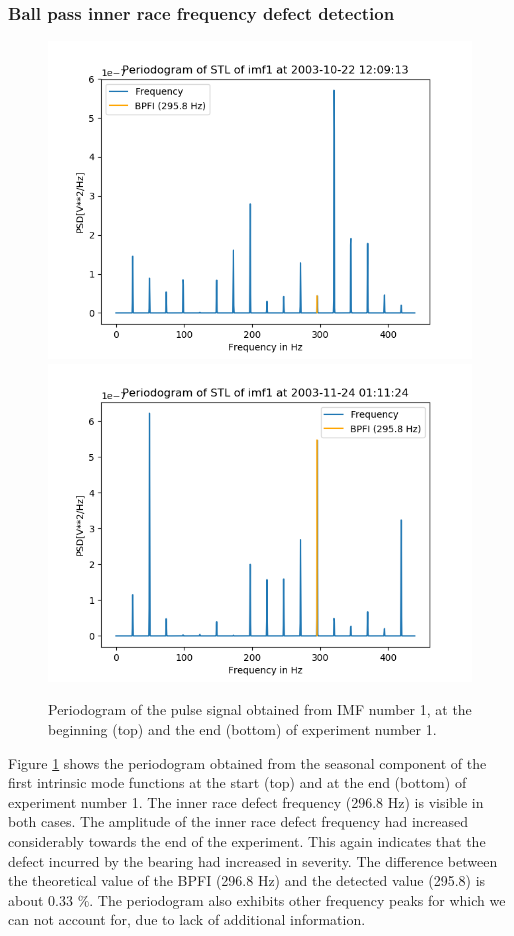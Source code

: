 \documentclass[../Main/thesis.tex]{subfiles}
\begin{document}
\subsubsection{ Ball pass inner race frequency defect detection }

\begin{figure}[H]
	\centering
	\includegraphics[width=0.8\linewidth]{../fig/periodogram_bpfi/start_imf1_bpfi}
	\includegraphics[width=0.8\linewidth]{../fig/periodogram_bpfi/end_imf1_bpfi}
	\caption{Periodogram of the pulse signal obtained from IMF number 1, at the beginning (top) and the end (bottom) of experiment number 1.}
	\label{fig:startimf1bpfi}
\end{figure}
\justify
Figure \ref{fig:startimf1bpfi} shows the periodogram obtained from the seasonal component of the first intrinsic mode functions at the start (top) and at the end (bottom) of experiment number 1. The inner race defect frequency (296.8 Hz) is visible in both cases. The amplitude of the inner race defect frequency had increased considerably towards the end of the experiment. This again indicates that the defect incurred by the bearing had increased in severity.
The difference between the theoretical value of the BPFI (296.8 Hz) and the detected value (295.8) is about 0.33 $\%$. The periodogram also exhibits other frequency peaks for which we can not account for, due to lack of additional information.
\justify
\end{document}
